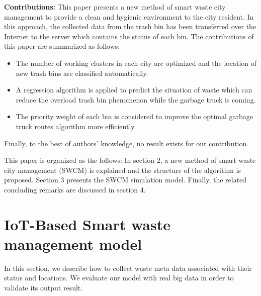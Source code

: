 \documentclass[conference]{IEEEtran}
\begin{document}
\par\textbf{Contributions:} 
This paper presents a new method of smart waste city management to provide a clean and hygienic environment to the city resident. In this approach, the collected data from the trash bin has been transferred over the Internet to the server which contains the status of each bin. The contributions of this paper are summarized as follows:


\begin{itemize}
	\item The number of working clusters in each city are optimized and the location of new trash bins are classified automatically. 
	
	\item A regression algorithm is applied to predict the situation of waste which can reduce the overload trash bin phenomenon while the garbage truck is coming.
	
	\item The priority weight of each bin is considered to improve the optimal garbage truck routes algorithm more efficiently.
	
\end{itemize}

Finally, to the best of authors’ knowledge, no result exists for our contribution. 

This paper is organized as the follows: In section 2,  a new method of smart waste city management (SWCM) is explained and the structure of the algorithm is proposed. Section 3 presents the SWCM simulation model. Finally, the related concluding remarks are discussed in section 4.



\section{IoT-Based Smart waste management model}
In this section, we describe how to collect waste meta data associated with their status and locations. We evaluate our model with real big data in order to validate its output result.
\end{document}
